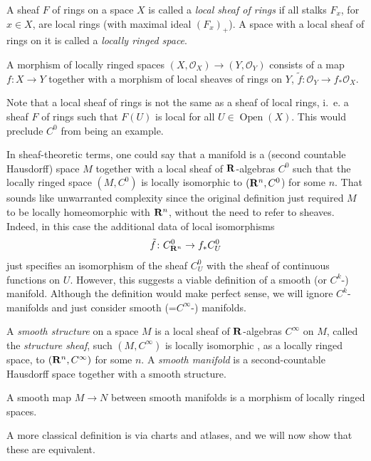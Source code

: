 \documentclass[a4paper,openany]{scrbook}
\DeclareMathOperator{\Open}{Open}
\begin{document}
\begin{defn}
A sheaf $F$ of rings on a space $X$ is called a \emph{local sheaf of rings} if all stalks $F_x$, for $x\in X$, are local rings (with maximal ideal $(F_x)_+$). A space with a local sheaf of rings on it is called a \emph{locally ringed space}.

A morphism of locally ringed spaces $(X,\mathcal O_X) \to (Y,\mathcal O_Y)$ consists of a map $f\colon X \to Y$ together with a morphism of local sheaves of rings on $Y$, $\tilde f\colon \mathcal O_Y \to f_*\mathcal O_X$. 
\end{defn}

Note that a local sheaf of rings is not the same as a sheaf of local rings, i.~e. a sheaf $F$ of rings such that $F(U)$ is local for all $U \in \Open(X)$. This would preclude $C^0$ from being an example.

In sheaf-theoretic terms, one could say that a manifold is a (second countable Hausdorff) space $M$ together with a local sheaf of $\mathbf R$-algebras $C^0$ such that the locally ringed space $(M,C^0)$ is locally isomorphic to $(\mathbf R^n,C^0$) for some $n$. That sounds like unwarranted complexity since the original definition just required $M$ to be locally homeomorphic with $\mathbf R^n$, without the need to refer to sheaves. Indeed, in this case the additional data of local isomorphisms
\[
\tilde f\colon C^0_{\mathbf R^n} \to f_*C^0_{U}
\]
just specifies an isomorphism of the sheaf $C^0_U$ with the sheaf of continuous functions on $U$. 
However, this suggests a viable definition of a smooth (or $C^k$-) manifold. Although the definition would make perfect sense, we will ignore $C^k$-manifolds and just consider smooth (=$C^\infty$-) manifolds. 

\begin{defn}
A \emph{smooth structure} on a space $M$ is a local sheaf of $\mathbf R$-algebras $C^\infty$ on $M$, called the \emph{structure sheaf}, such $(M,C^\infty)$ is locally isomorphic , as a locally ringed space, to $(\mathbf R^n,C^\infty)$ for some $n$. A \emph{smooth manifold} is a second-countable Hausdorff space together with a smooth structure.

A smooth map $M \to N$ between smooth manifolds is a morphism of locally ringed spaces.
\end{defn}

A more classical definition is via charts and atlases, and we will now show that these are equivalent.
\end{document}
